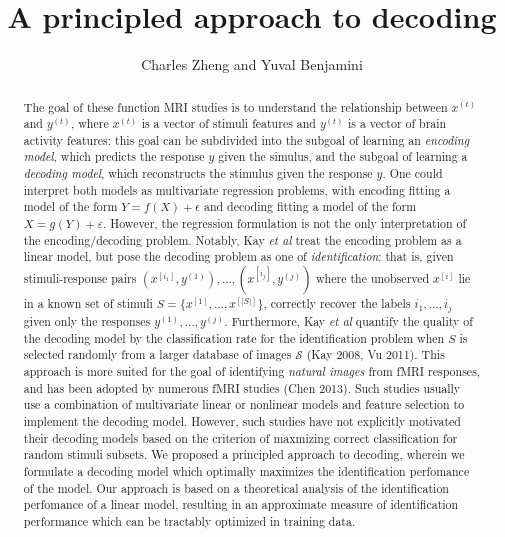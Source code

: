 \documentclass[11pt]{article}
\begin{document}
\newcommand{\tr}{\text{tr}}
\newcommand{\E}{\textbf{E}}
\newcommand{\diag}{\text{diag}}
\newcommand{\argmax}{\text{argmax}}
\newcommand{\argmin}{\text{argmin}}
\newcommand{\Cov}{\text{Cov}}
\newcommand{\Vol}{\text{Vol}}
\pagestyle{fancy}

\title{A principled approach to decoding}

\author{Charles Zheng and Yuval Benjamini}

\maketitle

\begin{abstract}
The goal of these function MRI studies is to understand the
relationship between $x^{(t)}$ and $y^{(t)}$, where $x^{(t)}$ is a
vector of stimuli features and $y^{(t)}$ is a vector of brain activity
features: this goal can be subdivided into the subgoal of learning an
\emph{encoding model}, which predicts the response $y$ given the
simulus, and the subgoal of learning a \emph{decoding model}, which
reconstructs the stimulus given the response $y$.  One could interpret
both models as multivariate regression problems, with encoding fitting
a model of the form $Y = f(X) + \epsilon$ and decoding fitting a model
of the form $X = g(Y) + \varepsilon$.  However, the regression
formulation is not the only interpretation of the encoding/decoding
problem.  Notably, Kay \emph{et al} treat the encoding problem as a
linear model, but pose the decoding problem as one of
\emph{identification}: that is, given stimuli-response pairs
$(x^{[i_1]}, y^{(1)}), \hdots, (x^{[i_j]}, y^{(j)})$ where the
unobserved $x^{[i]}$ lie in a known set of stimuli $S =
\{x^{[1]},\hdots, x^{[|S|]}\}$, correctly recover the labels
$i_1,\hdots, i_j$ given only the responses $y^{(1)}, \hdots, y^{(j)}$.
Furthermore, Kay \emph{et al} quantify the quality of the decoding
model by the classification rate for the identification problem when
$S$ is selected randomly from a larger database of images
$\mathcal{S}$ (Kay 2008, Vu 2011).  This approach is more suited for
the goal of identifying \emph{natural images} from fMRI responses, and
has been adopted by numerous fMRI studies (Chen 2013). Such studies
usually use a combination of multivariate linear or nonlinear models
and feature selection to implement the decoding model.  However, such
studies have not explicitly motivated their decoding models based on
the criterion of maxmizing correct classification for random stimuli
subsets.  We proposed a principled approach to decoding, wherein we
formulate a decoding model which optimally maximizes the
identification perfomance of the model.  Our approach is based on a
theoretical analysis of the identification perfomance of a linear
model, resulting in an approximate measure of identification
performance which can be tractably optimized in training data.
\end{abstract}
\end{document}
